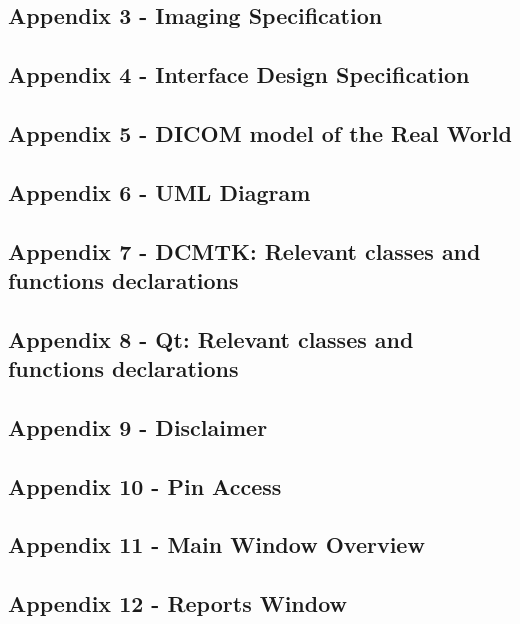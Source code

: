 \documentclass[11pt,twoside]{article}
\begin{document}
\clearpage

\subsection {Appendix 3 - Imaging Specification}



\clearpage
\subsection {Appendix 4 - Interface Design Specification}


\clearpage

\subsection {Appendix 5 - DICOM model of the Real World}


\clearpage

\subsection {Appendix 6 - UML Diagram}
%

\clearpage

\subsection {Appendix 7 - DCMTK: Relevant classes and functions declarations}


\clearpage
\subsection {Appendix 8 - Qt: Relevant classes and functions declarations}


\clearpage
\subsection {Appendix 9 - Disclaimer}


\clearpage
\subsection {Appendix 10 - Pin Access}


\clearpage
\subsection {Appendix 11 - Main Window Overview}


\clearpage
\subsection {Appendix 12 - Reports Window}


\printbibliography
\end{document}
